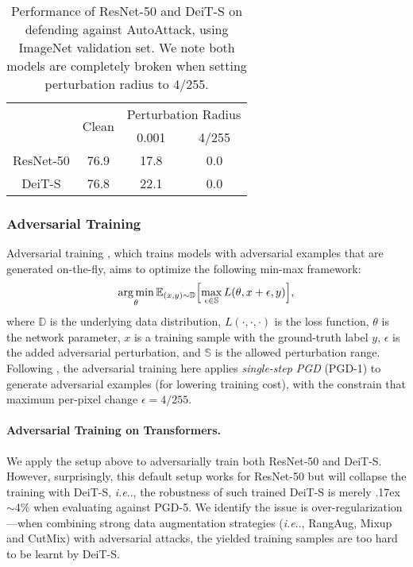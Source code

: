 \documentclass{article}
\makeatletter
\DeclareMathOperator*{\argmin}{arg\,min}
\newcommand{\app}{\raise.17ex\hbox{$\scriptstyle\sim$}}
\DeclareRobustCommand\onedot{\futurelet\@let@token\@onedot}
\def\@onedot{\ifx\@let@token.\else.\null\fi\xspace}
\def\ie{\emph{i.e}\onedot} \def\Ie{\emph{I.e}\onedot}
\makeatother
\begin{document}
\begin{table}[h!]
\caption{Performance of ResNet-50 and DeiT-S on defending against AutoAttack, using ImageNet validation set. We note both models are completely broken  when setting perturbation radius to 4/255.}
\centering
\footnotesize
\begin{tabular}{c|c|c|c}
\shline
                     & \multirow{2}{*}{Clean}                & \multicolumn{2}{c}{Perturbation Radius}                                              \\ \cline{3-4}
                     &                   & 0.001                &   4/255                   \\ \shline
ResNet-50            &     76.9                 &      17.8                &      0.0                                  \\ DeiT-S     &  76.8   &           22.1            &                     0.0            \\ \hline
\end{tabular}
\label{fig:cleanautoattack}
\end{table}



\subsubsection{Adversarial Training} 
Adversarial training \cite{Goodfellow2015,Madry2018}, which trains models with adversarial examples that are generated on-the-fly, aims to optimize the following min-max framework:
\begin{align}
\label{eq:adv_training}
\argmin_{\theta}
\mathbb{E}_{(x, y) \sim \mathbb{D}}
\Bigl[ 
\max_{\epsilon \in \mathbb{S}}
L(\theta, x + \epsilon, y)
\Bigr],
\end{align}
where $\mathbb{D}$ is the underlying data distribution,  $L(\cdot, \cdot, \cdot)$ is the loss function, $\theta$ is the network parameter, $x$ is a training sample with the ground-truth label $y$, $\epsilon$ is the added adversarial perturbation, and $\mathbb{S}$ is the allowed perturbation range.  Following \cite{Xie2019a,wong2020fast}, the adversarial training here applies \emph{single-step PGD} (PGD-1) to generate adversarial examples (for lowering training cost), with the constrain that maximum per-pixel change $\epsilon=4/255$.

\paragraph{Adversarial Training on Transformers.} We apply the setup above to adversarially train both ResNet-50 and DeiT-S. However, surprisingly, this default setup works for ResNet-50 but will collapse the training with DeiT-S, \ie, the robustness of such trained DeiT-S is merely \app4\% when evaluating against PGD-5. We identify the issue is over-regularization---when combining strong data augmentation strategies (\ie, RangAug, Mixup and CutMix) with adversarial attacks, the yielded training samples are too hard to be learnt by DeiT-S. 
\end{document}
